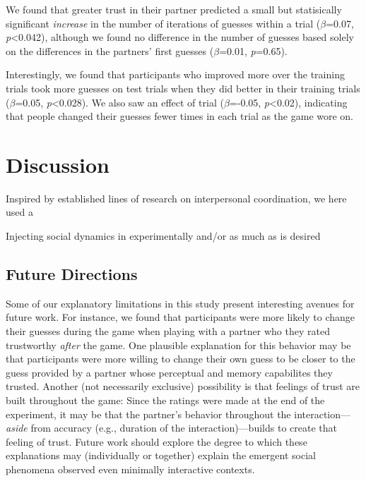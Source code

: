 \documentclass[10pt, letterpaper]{article}
\begin{document}
We found that greater trust in their partner predicted a small but
statisically significant \emph{increase} in the number of iterations of
guesses within a trial (\emph{\(\beta\)}=0.07,
\emph{p}\textless{}0.042), although we found no difference in the number
of guesses based solely on the differences in the partners' first
guesses (\emph{\(\beta\)}=0.01, \emph{p}=0.65).

Interestingly, we found that participants who improved more over the
training trials took more guesses on test trials when they did better in
their training trials (\emph{\(\beta\)}=0.05, \emph{p}\textless{}0.028).
We also saw an effect of trial (\emph{\(\beta\)}=-0.05,
\emph{p}\textless{}0.02), indicating that people changed their guesses
fewer times in each trial as the game wore on.

\section{Discussion}\label{discussion}

Inspired by established lines of research on interpersonal coordination,
we here used a

Injecting social dynamics in experimentally and/or as much as is desired

\subsection{Future Directions}\label{future-directions}

Some of our explanatory limitations in this study present interesting
avenues for future work. For instance, we found that participants were
more likely to change their guesses during the game when playing with a
partner who they rated trustworthy \emph{after} the game. One plausible
explanation for this behavior may be that participants were more willing
to change their own guess to be closer to the guess provided by a
partner whose perceptual and memory capabilites they trusted. Another
(not necessarily exclusive) possibility is that feelings of trust are
built throughout the game: Since the ratings were made at the end of the
experiment, it may be that the partner's behavior throughout the
interaction---\emph{aside} from accuracy (e.g., duration of the
interaction)---builds to create that feeling of trust. Future work
should explore the degree to which these explanations may (individually
or together) explain the emergent social phenomena observed even
minimally interactive contexts.
\end{document}
